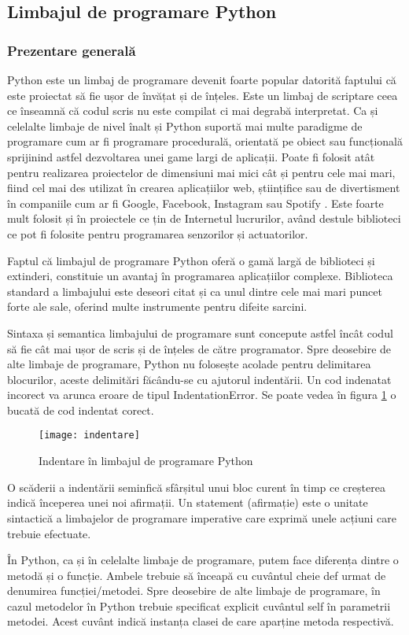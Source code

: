 \documentclass[../IoMusT.tex]{subfiles}
\begin{document}
\subsection{Limbajul de programare Python}
\subsubsection{Prezentare generală}
Python este un limbaj de programare devenit foarte popular datorită faptului că este proiectat să fie ușor de învățat și de înțeles. Este un limbaj de scriptare ceea ce înseamnă că codul scris nu este compilat ci mai degrabă interpretat. Ca și celelalte limbaje de nivel înalt și Python suportă mai multe paradigme de programare cum ar fi programare procedurală, orientată pe obiect sau funcțională sprijinind astfel dezvoltarea unei game largi de aplicații. Poate fi folosit atât pentru realizarea proiectelor de dimensiuni mai mici cât și pentru cele mai mari, fiind cel mai des utilizat în crearea aplicațiilor web, științifice sau de divertisment în companiile cum ar fi Google, Facebook, Instagram sau Spotify \cite{pythonWhere}. Este foarte mult folosit și în proiectele ce țin de Internetul lucrurilor, având destule biblioteci ce pot fi folosite pentru programarea senzorilor și actuatorilor.
\\
\par Faptul că limbajul de programare Python oferă o gamă largă de biblioteci și extinderi, constituie un avantaj în programarea aplicațiilor complexe. Biblioteca standard a limbajului este deseori citat și ca unul dintre cele mai mari puncet forte ale sale, oferind multe instrumente pentru difeite sarcini.
\\
\par Sintaxa și semantica limbajului de programare sunt concepute astfel încât codul să fie cât mai ușor de scris și de înțeles de către programator. Spre deosebire de alte limbaje de programare, Python nu folosește acolade pentru delimitarea blocurilor, aceste delimitări făcându-se cu ajutorul indentării. Un cod indenatat incorect va arunca eroare de tipul IndentationError. Se poate vedea în figura \ref{fig:indent} o bucată de cod indentat corect.
\begin{figure}[h]
\centering
\texttt{[image: indentare]}
\caption{Indentare în limbajul de programare Python}
\label{fig:indent}
\end{figure}
O scăderii  a indentării  seminfică sfârșitul unui bloc curent în timp ce creșterea indică începerea unei noi afirmații. Un statement (afirmație) este o unitate sintactică a limbajelor de programare imperative care exprimă  unele acțiuni care trebuie efectuate.
\\
\par În Python, ca și în celelalte limbaje de programare, putem face diferența dintre o metodă și o funcție. Ambele trebuie să înceapă cu cuvântul cheie def urmat de denumirea funcției/metodei. Spre deosebire de alte limbaje de programare, în cazul metodelor în Python trebuie specificat explicit cuvântul self în parametrii metodei. Acest cuvânt indică instanța clasei de care aparține metoda respectivă.
\end{document}
